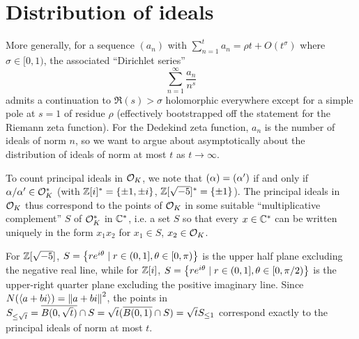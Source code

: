 \documentclass[11pt]{article}
\begin{document}
\section{Distribution of ideals}
More generally, for a sequence $(a_n)$ with $\sum_{n = 1}^t a_n = \rho t + O(t^\sigma)$ where $\sigma \in [0, 1)$, the associated ``Dirichlet series''
$$
    \sum_{n = 1}^\infty \frac{a_n}{n^s}
$$
admits a continuation to $\Re(s) > \sigma$ holomorphic everywhere except for a simple pole at $s = 1$ of residue $\rho$ (effectively bootstrapped off the statement for the Riemann zeta function). For the Dedekind zeta function, $a_n$ is the number of ideals of norm $n$, so we want to argue about asymptotically about the distribution of ideals of norm at most $t$ as $t \to \infty$.

To count principal ideals in $\mathcal{O}_K$, we note that $(\alpha) = (\alpha')$ if and only if $\alpha/\alpha' \in \mathcal{O}_K^*$ (with $\mathbb{Z}[i]^* = \left\{  \pm 1, \pm i  \right\}$, $\mathbb{Z}[\sqrt{-5}]^* = \left\{  \pm 1  \right\}$). The principal ideals in $\mathcal{O}_K$ thus correspond to the points of $\mathcal{O}_K$ in some suitable ``multiplicative complement'' $S$ of $\mathcal{O}_K^*$ in $\mathbb{C}^*$, i.e. a set $S$ so that every $x \in \mathbb{C}^*$ can be written uniquely in the form $x_1x_2$ for $x_1 \in S$, $x_2 \in \mathcal{O}_K$. 

For $\mathbb{Z}[\sqrt{-5}]$, $S = \left\{  re^{i\theta} \mid r \in (0, 1], \theta \in [0, \pi)  \right\}$ is the upper half plane excluding the negative real line, while for $\mathbb{Z}[i]$, $S = \left\{  re^{i\theta} \mid r \in (0, 1], \theta \in [0, \pi/2)  \right\}$ is the upper-right quarter plane excluding the positive imaginary line. Since $N(\left\langle a + bi \right\rangle) = \left\| a + bi \right\|^2$, the points in $S_{\leq \sqrt{t}} = \overline{B(0, \sqrt{t})} \cap S = \sqrt{t}(\overline{B(0, 1)} \cap S) = \sqrt{t}S_{\leq 1}$ correspond exactly to the principal ideals of norm at most $t$. 
\end{document}
